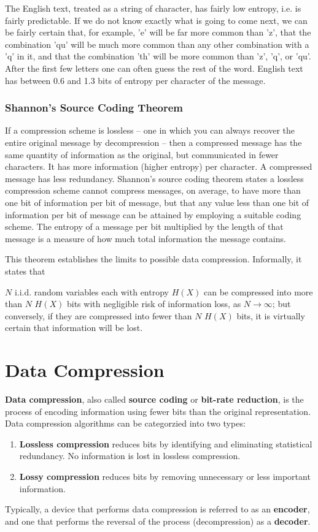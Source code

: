 \documentclass[a4paper, 12pt]{report}
\theoremstyle{remark}
\theoremstyle{definition}
\begin{document}
The English text, treated as a string of character, has fairly low entropy, i.e. is fairly predictable. If we do not know exactly what is going to come next, we can be fairly certain that, for example, 'e' will be far more common than 'z', that the combination 'qu' will be much more common than any other combination with a 'q' in it, and that the combination 'th' will be more common than 'z', 'q', or 'qu'. After the first few letters one can often guess the rest of the word. English text has between 0.6 and 1.3 bits of entropy per character of the message. 

\subsubsection{Shannon's Source Coding Theorem}
If a compression scheme is lossless – one in which you can always recover the entire original message by decompression – then a compressed message has the same quantity of information as the original, but communicated in fewer characters. It has more information (higher entropy) per character. A compressed message has less redundancy. Shannon's source coding theorem states a lossless compression scheme cannot compress messages, on average, to have more than one bit of information per bit of message, but that any value less than one bit of information per bit of message can be attained by employing a suitable coding scheme. The entropy of a message per bit multiplied by the length of that message is a measure of how much total information the message contains.

This theorem establishes the limits to possible data compression. Informally, it states that 
\begin{center}
    $N$ i.i.d. random variables each with entropy $H(X)$ can be compressed into more than $N$ $H(X)$ bits with negligible risk of information loss, as $N \rightarrow \infty$; but conversely, if they are compressed into fewer than $N$ $H(X)$ bits, it is virtually certain that information will be lost. 
\end{center}


\section{Data Compression}
\textbf{Data compression}, also called \textbf{source coding} or  \textbf{bit-rate reduction}, is the process of encoding information using fewer bits than the original representation. Data compression algorithms can be categorzied into two types: 
\begin{enumerate}
    \item \textbf{Lossless compression} reduces bits by identifying and eliminating statistical redundancy. No information is lost in lossless compression. 
    \item \textbf{Lossy compression} reduces bits by removing unnecessary or less important information.
\end{enumerate}
Typically, a device that performs data compression is referred to as an \textbf{encoder}, and one that performs the reversal of the process (decompression) as a \textbf{decoder}. 
\end{document}
